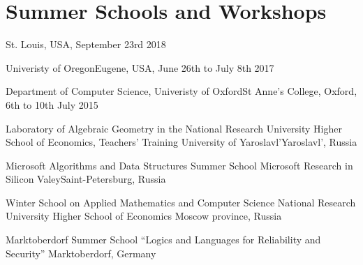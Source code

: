 \section{Summer Schools and Workshops}

      {}{St. Louis, USA, September 23rd 2018}%
      {}%
      {%
      }

      {Univeristy of Oregon}{Eugene, USA, June 26th to July 8th 2017}%
      {}%
      {%
      }

      {Department of Computer Science, Univeristy of Oxford}{St Anne's College, Oxford, 6th to 10th July 2015}%
      {}%
      {%
      }

      {Laboratory of Algebraic Geometry in the National Research University Higher School of Economics, Teachers' Training University of Yaroslavl'}{Yaroslavl', Russia}%
      {}%
      {%
      }

      {Microsoft Algorithms and Data Structures Summer School}%
      {Microsoft Research in Silicon Valey}{Saint-Petersburg, Russia}{}%
      {%
      }

      {Winter School on Applied Mathematics and Computer Science}%
      {National Research University Higher School of Economics}%
      {Moscow province, Russia}{}%
      {%
      }

      {Marktoberdorf Summer School “Logics and Languages for Reliability and Security”}%
      {}{Marktoberdorf, Germany}{}%
      {%
      }
